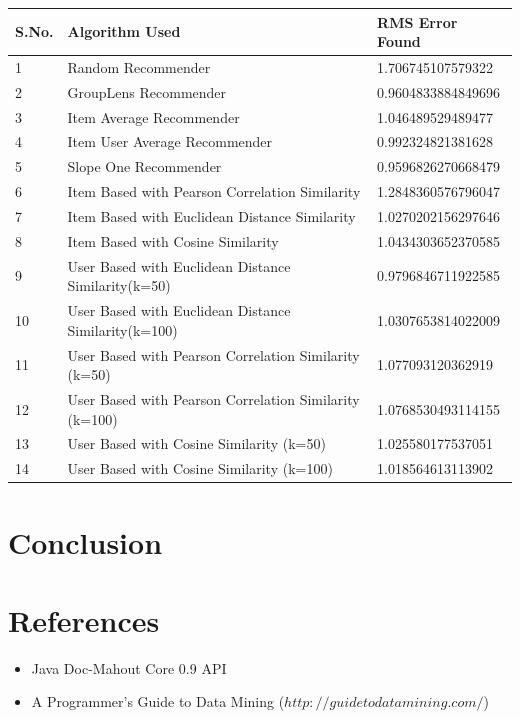 \documentclass{article}
\begin{document}
\begin{tabular}{| l | l | l |}
\hline
\textbf{S.No.} & \textbf{Algorithm Used} & \textbf{RMS Error Found} \\ \hline
1 & Random Recommender & 1.706745107579322 \\ \hline
2 & GroupLens Recommender & 0.9604833884849696 \\ \hline
3 & Item Average Recommender & 1.046489529489477 \\ \hline
4 & Item User Average Recommender & 0.992324821381628 \\ \hline
5 & Slope One Recommender & 0.9596826270668479 \\ \hline
6 & Item Based with Pearson Correlation Similarity & 1.2848360576796047 \\ \hline
7 & Item Based with Euclidean Distance Similarity & 1.0270202156297646 \\ \hline
8 & Item Based with Cosine Similarity & 1.0434303652370585 \\ \hline
9 & User Based with Euclidean Distance Similarity(k=50) & 0.9796846711922585 \\ \hline
10 & User Based with Euclidean Distance Similarity(k=100) & 1.0307653814022009 \\ \hline
11 & User Based with Pearson Correlation Similarity (k=50) & 1.077093120362919 \\ \hline
12 & User Based with Pearson Correlation Similarity (k=100) & 1.0768530493114155 \\ \hline
13 & User Based with Cosine Similarity (k=50) & 1.025580177537051 \\ \hline
14 & User Based with Cosine Similarity (k=100) & 1.018564613113902 \\ \hline
\end{tabular}

\section{Conclusion}
\section{References}
\begin{itemize}
\item Java Doc-Mahout Core 0.9 API
\item A Programmer's Guide to Data Mining ($http://guidetodatamining.com/$)
\end{itemize}
\end{document}
